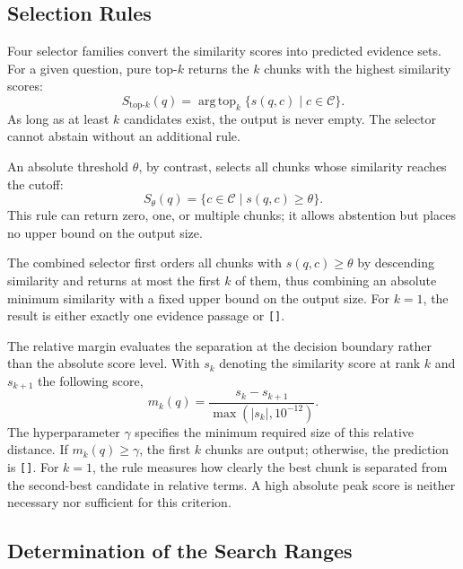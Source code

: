 \documentclass[11pt]{article}
\begin{document}
\subsection{Selection Rules}

Four selector families convert the similarity scores into predicted evidence sets. For a given question, pure top-$k$ returns the $k$ chunks with the highest similarity scores:
\begin{equation}
S_{\mathrm{top}\text{-}k}(q)=\operatorname{arg\,top}_{k}
\{s(q,c)\mid c\in\mathcal{C}\}.
\end{equation}
As long as at least $k$ candidates exist, the output is never empty. The selector cannot abstain without an additional rule.

An absolute threshold $\theta$, by contrast, selects all chunks whose similarity reaches the cutoff:
\begin{equation}
S_{\theta}(q)=\{c\in\mathcal{C}\mid s(q,c)\geq\theta\}.
\end{equation}
This rule can return zero, one, or multiple chunks; it allows abstention but places no upper bound on the output size.

The combined selector first orders all chunks with $s(q,c)\geq\theta$ by descending similarity and returns at most the first $k$ of them, thus combining an absolute minimum similarity with a fixed upper bound on the output size. For $k=1$, the result is either exactly one evidence passage or \texttt{[]}.

The relative margin evaluates the separation at the decision boundary rather than the absolute score level. With $s_k$ denoting the similarity score at rank $k$ and $s_{k+1}$ the following score,
\begin{equation}
m_k(q)=\frac{s_k-s_{k+1}}{\max(|s_k|,10^{-12})}.
\end{equation}
The hyperparameter $\gamma$ specifies the minimum required size of this relative distance. If $m_k(q)\geq\gamma$, the first $k$ chunks are output; otherwise, the prediction is \texttt{[]}. For $k=1$, the rule measures how clearly the best chunk is separated from the second-best candidate in relative terms. A high absolute peak score is neither necessary nor sufficient for this criterion.

\subsection{Determination of the Search Ranges}
\end{document}

